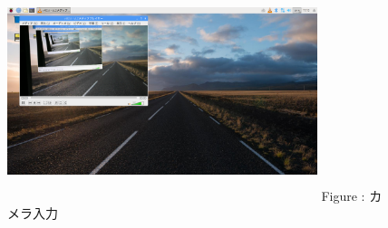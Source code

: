 \documentclass[a4paper,12pt]{jarticle}
\begin{document}
\begin{figure}[ht]
  \centering
  \begin{minipage}{9.156cm}
    \includegraphics[width=9.042cm,height=6.426cm]{textbook-img119.png}
    {\upshape
      Figure : カメラ入力}
  \end{minipage}
\end{figure}
\clearpage
\end{document}

